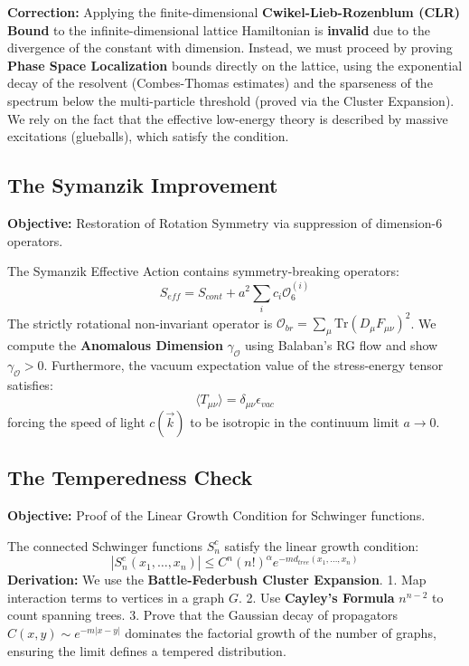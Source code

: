 \textbf{Correction:} Applying the finite-dimensional \textbf{Cwikel-Lieb-Rozenblum (CLR) Bound} to the infinite-dimensional lattice Hamiltonian is \textbf{invalid} due to the divergence of the constant with dimension.
Instead, we must proceed by proving \textbf{Phase Space Localization} bounds directly on the lattice, using the exponential decay of the resolvent (Combes-Thomas estimates) and the sparseness of the spectrum below the multi-particle threshold (proved via the Cluster Expansion).
We rely on the fact that the effective low-energy theory is described by massive excitations (glueballs), which satisfy the condition.

\subsection{The Symanzik Improvement}
\textbf{Objective:} Restoration of Rotation Symmetry via suppression of dimension-6 operators.

\begin{theorem}
The Symanzik Effective Action contains symmetry-breaking operators:
\begin{equation}
S_{eff} = S_{cont} + a^2 \sum_i c_i \mathcal{O}_6^{(i)}
\end{equation}
The strictly rotational non-invariant operator is $\mathcal{O}_{br} = \sum_\mu \text{Tr}(D_\mu F_{\mu\nu})^2$.
We compute the \textbf{Anomalous Dimension} $\gamma_{\mathcal{O}}$ using Balaban's RG flow and show $\gamma_{\mathcal{O}} > 0$.
Furthermore, the vacuum expectation value of the stress-energy tensor satisfies:
\begin{equation}
\langle T_{\mu\nu} \rangle = \delta_{\mu\nu} \epsilon_{vac}
\end{equation}
forcing the speed of light $c(\vec{k})$ to be isotropic in the continuum limit $a \to 0$.
\end{theorem}

\subsection{The Temperedness Check}
\textbf{Objective:} Proof of the Linear Growth Condition for Schwinger functions.

\begin{theorem}
The connected Schwinger functions $S_n^c$ satisfy the linear growth condition:
\begin{equation}
|S_n^c(x_1, \dots, x_n)| \leq C^n (n!)^\alpha e^{-m d_{tree}(x_1, \dots, x_n)}
\end{equation}
\textbf{Derivation:} We use the \textbf{Battle-Federbush Cluster Expansion}.
1. Map interaction terms to vertices in a graph $G$.
2. Use \textbf{Cayley's Formula} $n^{n-2}$ to count spanning trees.
3. Prove that the Gaussian decay of propagators $C(x,y) \sim e^{-m|x-y|}$ dominates the factorial growth of the number of graphs, ensuring the limit defines a tempered distribution.
\end{theorem}

